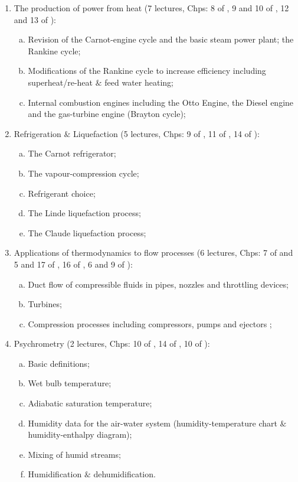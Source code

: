 \documentclass[11pt,oneside,a4paper]{article}
\begin{document}
\begin{enumerate}[{\bf Module 1:}]
\item The production of power from heat (7 lectures, Chps: 8 of \cite{smith_2001}, 9 and 10 of \cite{cengel_2010}, 12 and 13 of \cite{rajput_2007}): 
\begin{enumerate}[(a)]
\item Revision of the Carnot-engine cycle and the basic steam power plant; the Rankine cycle; 
\item Modifications of the Rankine cycle to increase efficiency including superheat/re-heat $\&$ feed water heating; 
\item Internal combustion engines including the Otto Engine, the Diesel engine and the gas-turbine engine (Brayton cycle); 
\end{enumerate}
%
\item Refrigeration $\&$ Liquefaction (5 lectures, Chps: 9 of \cite{smith_2001}, 11 of \cite{cengel_2010}, 14 of \cite{rajput_2007}):
\begin{enumerate}[(a)]
\item The Carnot refrigerator; 
\item The vapour-compression cycle; 
\item Refrigerant choice; 
\item The Linde liquefaction process; 
\item The Claude liquefaction process;
\end{enumerate}
%
\item Applications of thermodynamics to flow processes (6 lectures, Chps: 7 of \cite{smith_2001} and 5 and 17 of \cite{cengel_2010}, 16 of \cite{rajput_2007}, 6 and 9 of \cite{powers_2012}): 
\begin{enumerate}[(a)]
\item Duct flow of compressible fluids in pipes, nozzles and throttling devices; 
\item Turbines; 
\item Compression processes including compressors, pumps and ejectors ;
\end{enumerate}
%
\item Psychrometry (2 lectures, Chps: 10 of \cite{muller_2009}, 14 of \cite{cengel_2010}, 10 of \cite{rajput_2007}): 
\begin{enumerate}[(a)]
\item Basic definitions; 
\item Wet bulb temperature; 
\item Adiabatic saturation temperature; 
\item Humidity data for the air-water system (humidity-temperature chart $\&$ humidity-enthalpy diagram); 
\item Mixing of humid streams; 
\item Humidification $\&$ dehumidification.
\end{enumerate}

\end{enumerate}
\end{document}

